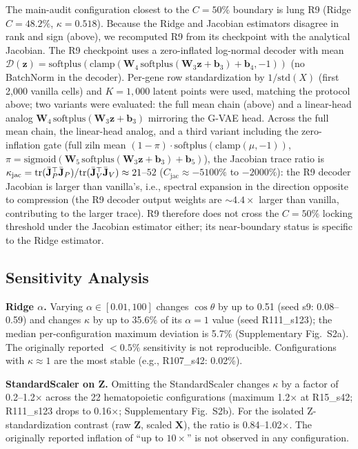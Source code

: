 \documentclass[11pt,a4paper]{article}
\newcommand{\Xmat}{\mathbf{X}}\newcommand{\Zmat}{\mathbf{Z}}
\begin{document}
The main-audit configuration closest to the $C=50\%$ boundary is lung R9 (Ridge $C=48.2\%$, $\kappa=0.518$). Because the Ridge and Jacobian estimators disagree in rank and sign (above), we recomputed R9 from its checkpoint with the analytical Jacobian. The R9 checkpoint uses a zero-inflated log-normal decoder with mean $\mathcal{D}(\mathbf{z})=\mathrm{softplus}(\mathrm{clamp}(\mathbf{W}_4\,\mathrm{softplus}(\mathbf{W}_3\mathbf{z}+\mathbf{b}_3)+\mathbf{b}_4,-1))$ (no BatchNorm in the decoder). Per-gene row standardization by $1/\mathrm{std}(X)$ (first 2{,}000 vanilla cells) and $K=1{,}000$ latent points were used, matching the protocol above; two variants were evaluated: the full mean chain (above) and a linear-head analog $\mathbf{W}_4\,\mathrm{softplus}(\mathbf{W}_3\mathbf{z}+\mathbf{b}_3)$ mirroring the G-VAE head. Across the full mean chain, the linear-head analog, and a third variant including the zero-inflation gate (full ziln mean $(1-\pi)\cdot\mathrm{softplus}(\mathrm{clamp}(\mu,-1))$, $\pi=\mathrm{sigmoid}(\mathbf{W}_5\,\mathrm{softplus}(\mathbf{W}_3\mathbf{z}+\mathbf{b}_3)+\mathbf{b}_5)$), the Jacobian trace ratio is $\kappa_{\mathrm{jac}}=\mathrm{tr}(\bar{\mathbf{J}}_P^\top\bar{\mathbf{J}}_P)/\mathrm{tr}(\bar{\mathbf{J}}_V^\top\bar{\mathbf{J}}_V)\approx21$--$52$ ($C_{\mathrm{jac}}\approx-5100\%$ to $-2000\%$): the R9 decoder Jacobian is larger than vanilla's, i.e., spectral expansion in the direction opposite to compression (the R9 decoder output weights are $\sim4.4\times$ larger than vanilla, contributing to the larger trace). R9 therefore does not cross the $C=50\%$ locking threshold under the Jacobian estimator either; its near-boundary status is specific to the Ridge estimator.

\subsection*{Sensitivity Analysis}

\textbf{Ridge $\alpha$.} Varying $\alpha \in [0.01, 100]$ changes $\cos\theta$ by up to 0.51 (seed s9: 0.08--0.59) and changes $\kappa$ by up to 35.6\% of its $\alpha=1$ value (seed R111\_s123); the median per-configuration maximum deviation is 5.7\% (Supplementary Fig.~S2a). The originally reported $<0.5\%$ sensitivity is not reproducible. Configurations with $\kappa\approx1$ are the most stable (e.g., R107\_s42: 0.02\%).

\textbf{StandardScaler on $\Zmat$.} Omitting the StandardScaler changes $\kappa$ by a factor of 0.2--1.2$\times$ across the 22 hematopoietic configurations (maximum 1.2$\times$ at R15\_s42; R111\_s123 drops to 0.16$\times$; Supplementary Fig.~S2b). For the isolated Z-standardization contrast (raw $\Zmat$, scaled $\Xmat$), the ratio is 0.84--1.02$\times$. The originally reported inflation of ``up to $10\times$'' is not observed in any configuration.
\end{document}

